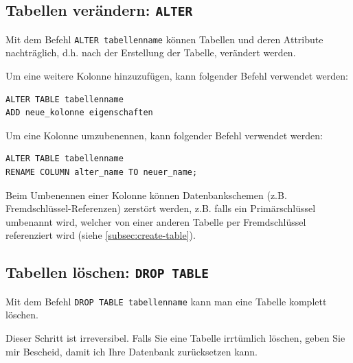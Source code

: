 \subsection{Tabellen verändern: \texorpdfstring{\lstinline|ALTER|}{ALTER}}
Mit dem Befehl \lstinline|ALTER tabellenname| können Tabellen und deren Attribute nachträglich, d.h. nach der Erstellung der Tabelle, verändert werden.

\begin{myexample}
Um eine weitere Kolonne hinzuzufügen, kann folgender Befehl verwendet werden:
\begin{lstlisting}
ALTER TABLE tabellenname
ADD neue_kolonne eigenschaften
\end{lstlisting}
\end{myexample}

\begin{myexample}
Um eine Kolonne umzubenennen, kann folgender Befehl verwendet werden:
\begin{lstlisting}
ALTER TABLE tabellenname
RENAME COLUMN alter_name TO neuer_name;
\end{lstlisting}
\end{myexample}
\begin{mycaution}
Beim Umbenennen einer Kolonne können Datenbankschemen (z.B. Fremdschlüssel-Referenzen) zerstört werden, z.B. falls ein Primärschlüssel umbenannt wird, welcher von einer anderen Tabelle per Fremdschlüssel referenziert wird (siehe \cref{subsec:create-table}).
\end{mycaution}

\subsection{Tabellen löschen: \texorpdfstring{\lstinline|DROP TABLE|}{DROP TABLE}}
Mit dem Befehl \lstinline|DROP TABLE tabellenname| kann man eine Tabelle komplett löschen.

\begin{mycaution}
  Dieser Schritt ist irreversibel. Falls Sie eine Tabelle irrtümlich löschen, geben Sie mir Bescheid, damit ich Ihre Datenbank zurücksetzen kann.
\end{mycaution}

